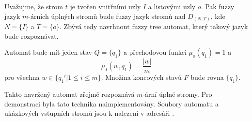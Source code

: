 \documentclass[a4paper,10pt]{article}
\begin{document}
Uvažujme, že strom $t$ je tvořen vnitřními uzly $I$ a listovými uzly $o$. Pak fuzzy jazyk $m$-árních úplných stromů bude fuzzy jazyk stromů nad $D_{(N,T)}$, kde $N = \{ I \}$ a $T = \{ o \}$. Zbývá tedy navrhnout fuzzy tree automat, který takový jazyk bude rozpoznávat.

Automat bude mít jeden stav $Q = \{ q_1 \}$ a přechodovou funkci $\mu_o(q_1) = 1$ a 
$$
  \mu_I(w, q_1) = \frac{|w|}{m}
$$
pro všechna $w \in \{ {q_1}^i |  1 \leq i \leq m \}$. Množina koncových stavů $F$ bude rovna $\{ q_1 \}$.

% 
% 
%   
%   

Takto navržený automat zřejmě rozpoznává $m$-ární úplné stromy. Pro demonstraci byla tato technika naimplementovány. Soubory automatu a ukázkových vstupních stromů jsou k nalezení v adresáři .


\end{document}
